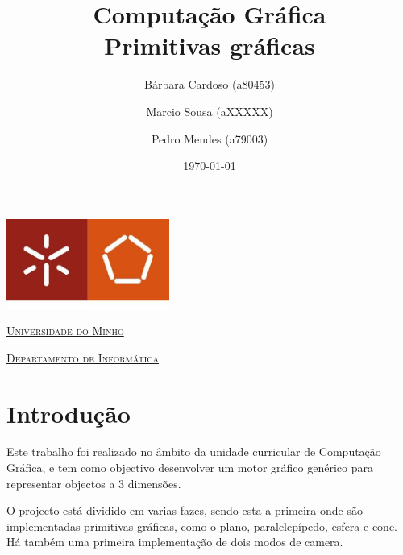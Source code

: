 \documentclass[a4paper]{article}
\begin{document}
\title{Computação Gráfica\\ Primitivas gráficas}
\author{Bárbara Cardoso (a80453) \and Marcio Sousa (aXXXXX) \and Pedro Mendes (a79003)}
\date{\today}

\begin{titlepage}

    \thispagestyle{empty}
    \begin{center}
        \begin{minipage}{0.75\linewidth}
            \centering
            \includegraphics[width=0.4\textwidth]{eng.jpeg}\par\vspace{1cm}
            \vspace{1.5cm}
            \href{https://www.uminho.pt/PT}{\scshape\LARGE Universidade do Minho} \par
            \vspace{1cm}
            \href{https://www.di.uminho.pt/}{\scshape\Large Departamento de Informática} \par
            \vspace{1.5cm}

            \maketitle
        \end{minipage}
    \end{center}

\end{titlepage}

\tableofcontents

\pagebreak

\section{Introdução}
Este trabalho foi realizado no âmbito da unidade curricular de Computação Gráfica, e tem como objectivo desenvolver um motor gráfico genérico para representar objectos a 3 dimensões.

O projecto está dividido em varias fazes, sendo esta a primeira onde são implementadas primitivas gráficas, como o plano, paralelepípedo, esfera e cone. Há também uma primeira implementação de dois modos de camera.
\end{document}
